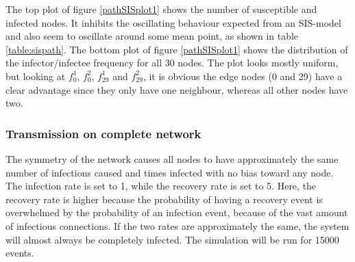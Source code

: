 \documentclass[12pt]{article} %
\numberwithin{equation}{section}
\begin{document}
The top plot of figure \ref{pathSISplot1} shows the number of susceptible and infected nodes. It inhibits the oscillating behaviour expected from an SIS-model and also seem to oscillate around some mean point, as shown in table \ref{table:sispath}. The bottom plot of figure \ref{pathSISplot1} shows the distribution of the infector/infectee frequency for all 30 nodes. The plot looks mostly uniform, but looking at $f^1_0$, $f^2_0$, $f_{29}^1$ and $f_{29}^2$, it is obvious the edge nodes (0 and 29) have a clear advantage since they only have one neighbour, whereas all other nodes have two.
\FloatBarrier
\subsubsection{Transmission on complete network}\label{simsis3}
The symmetry of the network causes all nodes to have approximately the same number of infections caused and times infected with no bias toward any node. The infection rate is set to 1, while the recovery rate is set to 5. Here, the recovery rate is higher because the probability of having a recovery event is overwhelmed by the probability of an infection event, because of the vast amount of infectious connections. If the two rates are approximately the same, the system will almost always be completely infected. The simulation will be run for 15000 events. 
\end{document}
